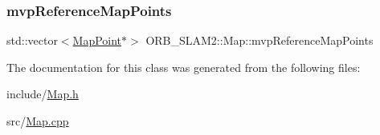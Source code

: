 \mbox{\label{class_o_r_b___s_l_a_m2_1_1_map_ad1d98a7e8207b995494afa7c098a7aaf}} 
\subsubsection{\texorpdfstring{mvp\+Reference\+Map\+Points}{mvpReferenceMapPoints}}
{\footnotesize\ttfamily std\+::vector$<$\mbox{\hyperlink{class_o_r_b___s_l_a_m2_1_1_map_point}{Map\+Point}}$\ast$$>$ O\+R\+B\+\_\+\+S\+L\+A\+M2\+::\+Map\+::mvp\+Reference\+Map\+Points\hspace{0.3cm}{\ttfamily [protected]}}



The documentation for this class was generated from the following files\+:\begin{DoxyCompactItemize}
\item 
include/\mbox{\hyperlink{_map_8h}{Map.\+h}}\item 
src/\mbox{\hyperlink{_map_8cpp}{Map.\+cpp}}\end{DoxyCompactItemize}
